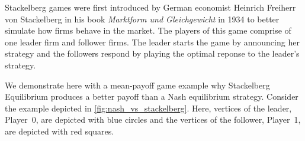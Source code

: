 
Stackelberg games were first introduced by German economist Heinrich Freiherr von Stackelberg in his book \textit{Marktform und Gleichgewicht} in 1934 \cite{S34} to better simulate how firms behave in the market. The players of this game comprise of one leader firm and follower firms. The leader starts the game by announcing her strategy and the followers respond by playing the optimal reponse to the leader's strategy.


We demonstrate here with a mean-payoff game example why Stackelberg Equilibrium produces a better payoff than a Nash equilibrium strategy. Consider the example depicted in \cref{fig:nash_vs_stackelberg}. Here, vertices of the leader, Player~0, are depicted with blue circles and the vertices of the follower, Player~1, are depicted with red squares.

